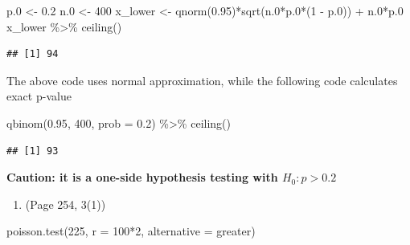 \documentclass{article}
\newenvironment{Shaded}{\begin{snugshade}}{\end{snugshade}}
\newcommand{\AttributeTok}[1]{\textcolor[rgb]{0.77,0.63,0.00}{#1}}
\newcommand{\DecValTok}[1]{\textcolor[rgb]{0.00,0.00,0.81}{#1}}
\newcommand{\FloatTok}[1]{\textcolor[rgb]{0.00,0.00,0.81}{#1}}
\newcommand{\FunctionTok}[1]{\textcolor[rgb]{0.00,0.00,0.00}{#1}}
\newcommand{\NormalTok}[1]{#1}
\newcommand{\OtherTok}[1]{\textcolor[rgb]{0.56,0.35,0.01}{#1}}
\newcommand{\SpecialCharTok}[1]{\textcolor[rgb]{0.00,0.00,0.00}{#1}}
\newcommand{\StringTok}[1]{\textcolor[rgb]{0.31,0.60,0.02}{#1}}
\begin{document}
\begin{Shaded}
\begin{Highlighting}[]
\NormalTok{p}\FloatTok{.0} \OtherTok{\textless{}{-}} \FloatTok{0.2}
\NormalTok{n}\FloatTok{.0} \OtherTok{\textless{}{-}} \DecValTok{400}
\NormalTok{x\_lower }\OtherTok{\textless{}{-}} \FunctionTok{qnorm}\NormalTok{(}\FloatTok{0.95}\NormalTok{)}\SpecialCharTok{*}\FunctionTok{sqrt}\NormalTok{(n}\FloatTok{.0}\SpecialCharTok{*}\NormalTok{p}\FloatTok{.0}\SpecialCharTok{*}\NormalTok{(}\DecValTok{1} \SpecialCharTok{{-}}\NormalTok{ p}\FloatTok{.0}\NormalTok{)) }\SpecialCharTok{+}\NormalTok{ n}\FloatTok{.0}\SpecialCharTok{*}\NormalTok{p}\FloatTok{.0}
\NormalTok{x\_lower }\SpecialCharTok{\%\textgreater{}\%} \FunctionTok{ceiling}\NormalTok{()}
\end{Highlighting}
\end{Shaded}

\begin{verbatim}
## [1] 94
\end{verbatim}

The above code uses normal approximation, while the following code
calculates exact p-value

\begin{Shaded}
\begin{Highlighting}[]
\FunctionTok{qbinom}\NormalTok{(}\FloatTok{0.95}\NormalTok{, }\DecValTok{400}\NormalTok{, }\AttributeTok{prob =} \FloatTok{0.2}\NormalTok{) }\SpecialCharTok{\%\textgreater{}\%} \FunctionTok{ceiling}\NormalTok{()}
\end{Highlighting}
\end{Shaded}

\begin{verbatim}
## [1] 93
\end{verbatim}

\textbf{Caution: it is a one-side hypothesis testing with $H_0: p > 0.2$}

\begin{enumerate}
\def\labelenumi{\arabic{enumi}.}
\setcounter{enumi}{1}
\tightlist
\item
  (Page 254, 3(1))
\end{enumerate}

\begin{Shaded}
\begin{Highlighting}[]
\FunctionTok{poisson.test}\NormalTok{(}\DecValTok{225}\NormalTok{, }\AttributeTok{r =} \DecValTok{100}\SpecialCharTok{*}\DecValTok{2}\NormalTok{, }\AttributeTok{alternative =} \StringTok{\textquotesingle{}greater\textquotesingle{}}\NormalTok{)}
\end{Highlighting}
\end{Shaded}
\end{document}
